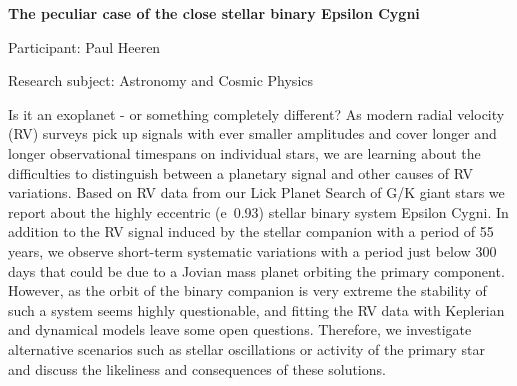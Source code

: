 \begin{minipage}[t]{1.0\textwidth}

\begin{center}

{{\large\bfseries The peculiar case of the close stellar binary Epsilon Cygni}\par}

\end{center}

{\noindent Participant: Paul Heeren\par} 

{\noindent Research subject: Astronomy and Cosmic Physics\par}\medskip

\noindent Is it an exoplanet - or something completely different? As modern radial velocity (RV) surveys pick up signals with ever smaller amplitudes and cover longer and longer observational timespans on individual stars, we are learning about the difficulties to distinguish between a planetary signal and other causes of RV variations. Based on RV data from our Lick Planet Search of G/K giant stars we report about the highly eccentric (e~0.93) stellar binary system Epsilon Cygni. In addition to the RV signal induced by the stellar companion with a period of 55 years, we observe short-term systematic variations with a period just below 300 days that could be due to a Jovian mass planet orbiting the primary component. However, as the orbit of the binary companion is very extreme the stability of such a system seems highly questionable, and fitting the RV data with Keplerian and dynamical models leave some open questions. Therefore, we investigate alternative scenarios such as stellar oscillations or activity of the primary star and discuss the likeliness and consequences of these solutions.\par\end{minipage}

\hfill 

